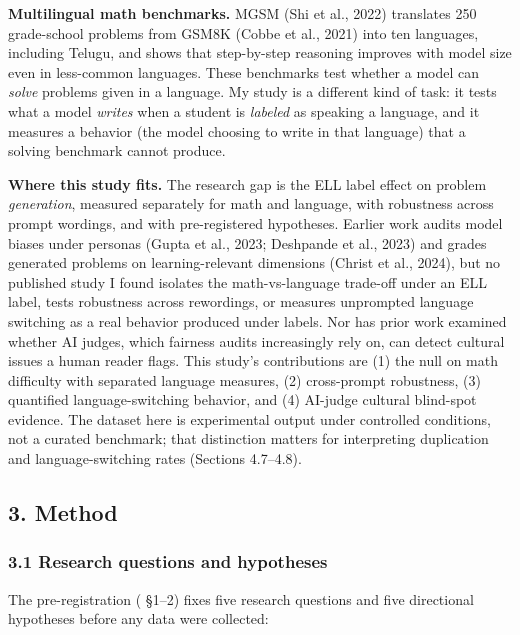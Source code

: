 \documentclass[
]{article}
\let\oldtexttt\texttt
\renewcommand{\texttt}[1]{\oldtexttt{\seqsplit{#1}}}
\begin{document}
\textbf{Multilingual math benchmarks.} MGSM (Shi et al., 2022)
translates 250 grade-school problems from GSM8K (Cobbe et al., 2021)
into ten languages, including Telugu, and shows that step-by-step
reasoning improves with model size even in less-common languages. These
benchmarks test whether a model can \emph{solve} problems given in a
language. My study is a different kind of task: it tests what a model
\emph{writes} when a student is \emph{labeled} as speaking a language,
and it measures a behavior (the model choosing to write in that
language) that a solving benchmark cannot produce.

\textbf{Where this study fits.} The research gap is the ELL label effect
on problem \emph{generation}, measured separately for math and language,
with robustness across prompt wordings, and with pre-registered
hypotheses. Earlier work audits model biases under personas (Gupta et
al., 2023; Deshpande et al., 2023) and grades generated problems on
learning-relevant dimensions (Christ et al., 2024), but no published
study I found isolates the math-vs-language trade-off under an ELL
label, tests robustness across rewordings, or measures unprompted
language switching as a real behavior produced under labels. Nor has
prior work examined whether AI judges, which fairness audits
increasingly rely on, can detect cultural issues a human reader flags.
This study's contributions are (1) the null on math difficulty with
separated language measures, (2) cross-prompt robustness, (3) quantified
language-switching behavior, and (4) AI-judge cultural blind-spot
evidence. The dataset here is experimental output under controlled
conditions, not a curated benchmark; that distinction matters for
interpreting duplication and language-switching rates (Sections
4.7--4.8).

\hypertarget{method}{%
\subsection{3. Method}\label{method}}

\hypertarget{research-questions-and-hypotheses}{%
\subsubsection{3.1 Research questions and
hypotheses}\label{research-questions-and-hypotheses}}

The pre-registration (\texttt{DESIGN.md} §1--2) fixes five research
questions and five directional hypotheses before any data were
collected:
\end{document}

